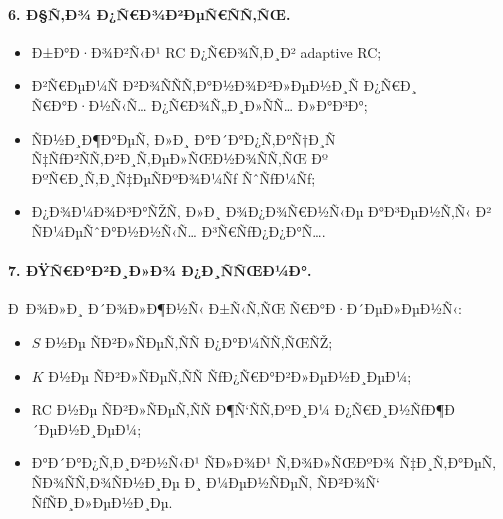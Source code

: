 \paragraph{6. Ð§Ñ‚Ð¾ Ð¿Ñ€Ð¾Ð²ÐµÑ€ÑÑ‚ÑŒ.}
\begin{itemize}
    \item Ð±Ð°Ð·Ð¾Ð²Ñ‹Ð¹ RC Ð¿Ñ€Ð¾Ñ‚Ð¸Ð² adaptive RC;
    \item Ð²Ñ€ÐµÐ¼Ñ Ð²Ð¾ÑÑÑ‚Ð°Ð½Ð¾Ð²Ð»ÐµÐ½Ð¸Ñ Ð¿Ñ€Ð¸ Ñ€Ð°Ð·Ð½Ñ‹Ñ… Ð¿Ñ€Ð¾Ñ„Ð¸Ð»ÑÑ… Ð»Ð°Ð³Ð°;
    \item ÑÐ½Ð¸Ð¶Ð°ÐµÑ‚ Ð»Ð¸ Ð°Ð´Ð°Ð¿Ñ‚Ð°Ñ†Ð¸Ñ Ñ‡ÑƒÐ²ÑÑ‚Ð²Ð¸Ñ‚ÐµÐ»ÑŒÐ½Ð¾ÑÑ‚ÑŒ Ðº ÐºÑ€Ð¸Ñ‚Ð¸Ñ‡ÐµÑÐºÐ¾Ð¼Ñƒ ÑˆÑƒÐ¼Ñƒ;
    \item Ð¿Ð¾Ð¼Ð¾Ð³Ð°ÑŽÑ‚ Ð»Ð¸ Ð¾Ð¿Ð¾Ñ€Ð½Ñ‹Ðµ Ð°Ð³ÐµÐ½Ñ‚Ñ‹ Ð² ÑÐ¼ÐµÑˆÐ°Ð½Ð½Ñ‹Ñ… Ð³Ñ€ÑƒÐ¿Ð¿Ð°Ñ….
\end{itemize}

\paragraph{7. ÐŸÑ€Ð°Ð²Ð¸Ð»Ð¾ Ð¿Ð¸ÑÑŒÐ¼Ð°.}
Ð Ð¾Ð»Ð¸ Ð´Ð¾Ð»Ð¶Ð½Ñ‹ Ð±Ñ‹Ñ‚ÑŒ Ñ€Ð°Ð·Ð´ÐµÐ»ÐµÐ½Ñ‹:
\begin{itemize}
    \item $S$ Ð½Ðµ ÑÐ²Ð»ÑÐµÑ‚ÑÑ Ð¿Ð°Ð¼ÑÑ‚ÑŒÑŽ;
    \item $K$ Ð½Ðµ ÑÐ²Ð»ÑÐµÑ‚ÑÑ ÑƒÐ¿Ñ€Ð°Ð²Ð»ÐµÐ½Ð¸ÐµÐ¼;
    \item RC Ð½Ðµ ÑÐ²Ð»ÑÐµÑ‚ÑÑ Ð¶Ñ‘ÑÑ‚ÐºÐ¸Ð¼ Ð¿Ñ€Ð¸Ð½ÑƒÐ¶Ð´ÐµÐ½Ð¸ÐµÐ¼;
    \item Ð°Ð´Ð°Ð¿Ñ‚Ð¸Ð²Ð½Ñ‹Ð¹ ÑÐ»Ð¾Ð¹ Ñ‚Ð¾Ð»ÑŒÐºÐ¾ Ñ‡Ð¸Ñ‚Ð°ÐµÑ‚ ÑÐ¾ÑÑ‚Ð¾ÑÐ½Ð¸Ðµ Ð¸ Ð¼ÐµÐ½ÑÐµÑ‚ ÑÐ²Ð¾Ñ‘ ÑƒÑÐ¸Ð»ÐµÐ½Ð¸Ðµ.
\end{itemize}

